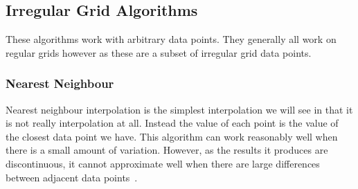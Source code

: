     \subsection{Irregular Grid Algorithms}\label{background_interpolation_methods_irregular_grid}

        These algorithms work with arbitrary data points. They generally all work on regular grids however as these are a subset of irregular grid data points. 

        \subsubsection{Nearest Neighbour}\label{background_interpolation_methods_nearest_neighbour}

            Nearest neighbour interpolation is the simplest interpolation we will see in that it is not really interpolation at all. Instead the value of each point is the value of the closest data point we have. This algorithm can work reasonably well when there is a small amount of variation. However, as the results it produces are discontinuous, it cannot approximate well when there are large differences between adjacent data points~\cite{imageresamplingcomparison}.

